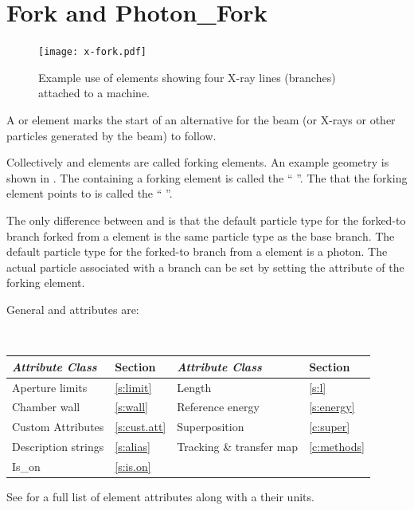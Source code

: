 \section{Fork and Photon_Fork}
\label{s:fork}

\begin{figure}[tb]
  \centering
  \texttt{[image: x-fork.pdf]}
  \caption[Example with photon_fork elements.]
  {
Example use of  elements showing four X-ray lines (branches) attached to a machine.
  }
  \label{f:x.fork}
\end{figure}

A  or  element marks the start of an alternative  for the beam
(or X-rays or other particles generated by the beam) to follow.

Collectively  and  elements are called forking elements. An example
geometry is shown in .  The  containing a forking element is called the
`` ''. The  that the forking element points to is called the
`` ''.

The only difference between  and  is that the default particle type for the
forked-to branch forked from a  element is the same particle type as the base branch. The
default particle type for the forked-to branch from a  element is a photon. The actual
particle associated with a branch can be set by setting the  attribute of the forking
element.

General  and  attributes are:
\begin{center}
\tt
\begin{tabular}{llll} \toprule
  {\sl Attribute Class}      & Section           & {\sl Attribute Class}      & Section         \\ \midrule
  Aperture limits            & \ref{s:limit}     & Length                     & \ref{s:l}       \\
  Chamber wall               & \ref{s:wall}      & Reference energy           & \ref{s:energy}  \\ 
  Custom Attributes          & \ref{s:cust.att}  & Superposition              & \ref{c:super}   \\
  Description strings        & \ref{s:alias}     & Tracking \& transfer map   & \ref{c:methods} \\ 
  Is_on                      & \ref{s:is.on}     &                            &                 \\
  \bottomrule
\end{tabular}
\end{center}
\toffset
See  for a full list of element attributes along with a their units.

